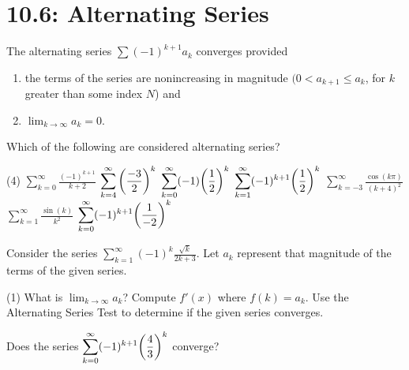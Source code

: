 \documentclass[../mathNotesPreamble]{subfiles}
\begin{document}
  \section{10.6: Alternating Series}

  \begin{thmBox*}
    The alternating series $\sum(-1)^{k+1}a_k$ converges provided
    \begin{enumerate}
      \item the terms of the series are nonincreasing in magnitude $(0< a_{k+1}\leq a_k$, for $k$ greater than some index $N$) and
      \item $\displaystyle \lim_{k\to \infty} a_k=0$.
    \end{enumerate}
  \end{thmBox*}
  \begin{ex*}
    Which of the following are considered alternating series?
  \end{ex*}
  \begin{tasks}[after-item-skip=\stretch{1}, label=,item-indent=0pt](4)
    \task $\displaystyle \sum_{k=0}^\infty \frac{(-1)^{k+1}}{k+2}$
    \task $\displaystyle \sum_{k=4}^\infty {\left(\frac{-3}{2}\right)}^k$
    \task $\displaystyle \sum_{k=0}^\infty (-1){\left(\frac{1}{2}\right)}^k$
    \task $\displaystyle \sum_{k=1}^\infty (-1)^{k+1}{\left(\frac{1}{2}\right)}^k$
    \task $\displaystyle \sum_{k=-3}^\infty \frac{\cos(k\pi)}{(k+4)^2}$
    \task $\displaystyle \sum_{k=1}^\infty \frac{\sin(k)}{k^2}$
    \task $\displaystyle \sum_{k=0}^\infty (-1)^{k+1}{\left(\frac{1}{-2}\right)}^k$
  \end{tasks}
  \pagebreak

  \begin{ex*}
    Consider the series $\displaystyle\sum_{k=1}^\infty (-1)^k \frac{\sqrt{k}}{2k+3}$. Let $a_k$ represent that magnitude of the terms of the given series.
  \end{ex*}
  \begin{tasks}[after-item-skip=\stretch{1}, label=\textbullet,item-indent=0pt](1)
    \task What is $\displaystyle\lim_{k\to \infty} a_k$?
    \task Compute $f'(x)$ where $f(k)=a_k$.
    \task Use the Alternating Series Test to determine if the given series converges.
  \end{tasks}
  \pagebreak

  \begin{ex*}
    Does the series $\displaystyle\sum_{k=0}^\infty (-1)^{k+1}{\left(\frac{4}{3}\right)}^k$ converge?
  \end{ex*}
\end{document}
